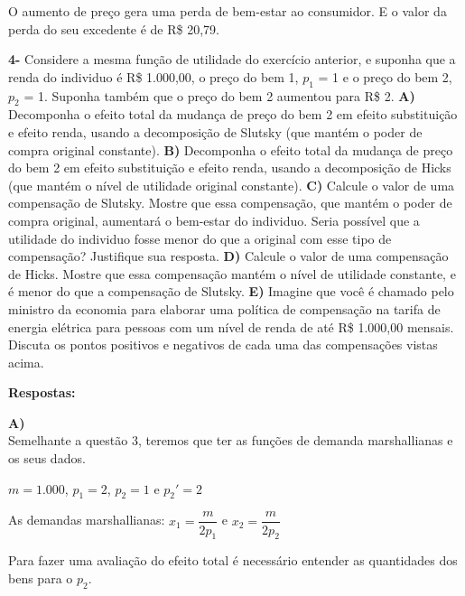 \documentclass[a4paper, 12pt]{article} %
\begin{document}
\begin{flushleft}
\begin{center}
O aumento de preço gera uma perda de bem-estar ao consumidor. E o valor da perda do seu excedente é de R\$ 20,79.
\end{center}

\singlespacing

\textbf{4-} Considere a mesma função de utilidade do exercício anterior, e suponha que a renda do individuo é R\$ 1.000,00, o preço do bem 1, $p_{1}$ = 1 e o preço do bem 2, $p_{2}$ = 1. Suponha também que o preço do bem 2 aumentou para R\$ 2.
\singlespacing
\textbf{A)} Decomponha o efeito total da mudança de preço do bem 2 em efeito substituição e efeito renda, usando a decomposição de Slutsky (que mantém o poder de compra original constante).
\singlespacing
\textbf{B)} Decomponha o efeito total da mudança de preço do bem 2 em efeito substituição e efeito renda, usando a decomposição de Hicks (que mantém o nível de utilidade original constante).
\singlespacing
\textbf{C)} Calcule o valor de uma compensação de Slutsky. Mostre que essa compensação, que mantém o poder de compra original, aumentará o bem-estar do individuo. Seria possível que a utilidade do individuo fosse menor do que a original com esse tipo de compensação?
Justifique sua resposta.
\singlespacing
\textbf{D)} Calcule o valor de uma compensação de Hicks. Mostre que essa compensação mantém o nível de utilidade constante, e é menor do que a compensação de Slutsky.
\singlespacing
\textbf{E)} Imagine que você é chamado pelo ministro da economia para elaborar uma política de compensação na tarifa de energia elétrica para pessoas com um nível de renda de até R\$ 1.000,00 mensais. Discuta os pontos positivos e negativos de cada uma das compensações vistas acima.

\singlespacing

\textbf{Respostas:}

\singlespacing

\textbf{A)}
\\
Semelhante a questão 3, teremos que ter as funções de demanda marshallianas e os seus dados.
\begin{center}
$m = 1.000$, $p_{1} = 2$, $p_{2} = 1$ e $p_{2}' = 2$
\end{center}
\begin{center}
As demandas marshallianas: $x_{1} = \dfrac{m}{2p_{1}}$ e $x_{2} = \dfrac{m}{2p_{2}}$
\end{center}
Para fazer uma avaliação do efeito total é necessário entender as quantidades dos bens para o $p_{2}$.


\end{flushleft}
\end{document}
